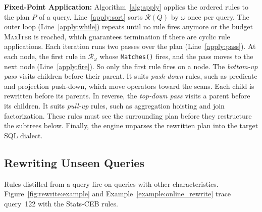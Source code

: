 \textbf{Fixed-Point Application:}
Algorithm~\ref{alg:apply} applies the ordered rules to the plan $P$ of a query.
Line~\ref{apply:sort} sorts $\mathcal{R}(Q)$ by $\omega$ once per query.
The outer loop (Line~\ref{apply:while}) repeats until no rule fires anymore or the budget \textsc{MaxIter} is reached, which guarantees termination if there are cyclic rule applications.
Each iteration runs two passes over the plan (Line~\ref{apply:pass}).
At each node, the first rule in $\mathcal{R}_\omega$ whose \texttt{Matches()} fires, and the pass moves to the next node (Line~\ref{apply:fire}). So only the first rule fires on a node.
The \emph{bottom-up pass} visits children before their parent. It suits \emph{push-down} rules, such as predicate and projection push-down, which move operators toward the scans. Each child is rewritten before its parents.
In reverse, the \emph{top-down pass} visits a parent before its children. It suits \emph{pull-up} rules, such as aggregation hoisting and join factorization. These rules must see the surrounding plan before they restructure the subtrees below.
Finally, the engine unparses the rewritten plan into the target SQL dialect.


\subsection{Rewriting Unseen Queries}
\label{sec:online:e2e}
Rules distilled from a query fire on queries with other characteristics.
Figure~\ref{fig:rewrite:example} and Example~\ref{example:online_rewrite} trace query~122 with the Stats-CEB rules.


